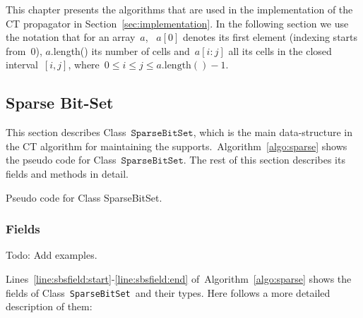 \documentclass[a4paper,11pt]{article}
\newcommand{\Todo}[1]{{\color{blue}#1}}
\newcommand{\Chapref}[1]{Section~\ref{#1}}
\newcommand{\Algoref}[1]{Algorithm~\ref{#1}}
\newcommand{\Linesref}[2]{Lines~\ref{#1}-\ref{#2}}
\newcommand{\Mask}{\texttt{mask}}
\newcommand{\SparseBitSet}{\texttt{SparseBitSet}}
\newcommand{\function}[1]{\mathrm{#1}}
\numberwithin{equation}{section}
\begin{document}

This chapter presents the algorithms that are used in the implementation of the
CT propagator in \Chapref{sec:implementation}.
In the following section we use the notation that for an array~$a$,
~$a[0]$ denotes its first element (indexing starts from~$0$),
$a$.length() its number of cells and~$a[i:j]$ all its cells in the closed
interval~$[i,j]$, where~$0 \leq i \leq j \leq a.\function{length}() - 1$.

\subsection{Sparse Bit-Set}
\label{sec:sbs}
This section describes Class~$\SparseBitSet$, which is the main data-structure
in the CT algorithm for maintaining the supports.~\Algoref{algo:sparse} shows the
pseudo code for Class~$\SparseBitSet$. The rest of this section describes its
fields and methods in detail.

\begin{algorithm}[H]
  \begin{algorithmic}[1]  %
    
    \end{algorithmic}
  \caption{Pseudo code for Class SparseBitSet.}
  \label{algo:sparse}
\end{algorithm}

\subsubsection{Fields}
\label{sbs:fields}

\Todo{Todo: Add examples.}

\Linesref{line:sbsfield:start}{line:sbsfield:end} of~\Algoref{algo:sparse} shows the fields
of Class~\SparseBitSet~and their types. Here follows a more detailed description of them:
\end{document}
